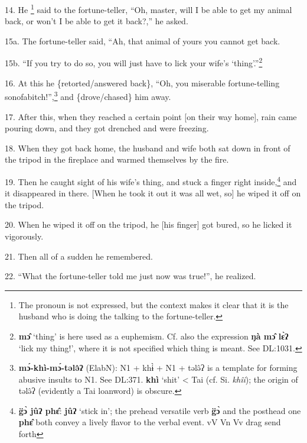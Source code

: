 14. He \footnote{The pronoun is not expressed, but the context makes it clear that it is the husband who is doing the talking to the fortune-teller.} said to the fortune-teller, ``Oh, master, will I be able to get my animal
back, or won't I be able to get it back?,'' he asked.

15a. The fortune-teller said, ``Ah, that animal of yours you cannot get back.

15b. ``If you try to do so, you will just have to lick your wife's `thing'.''\footnote{\textbf{mɔ̂ }`thing' is here used as a euphemism. Cf. also the expression \textbf{ŋà mɔ̂ lɛ̀ʔ} `lick my thing!', where it is not specified which thing is meant. See DL:1031.}

16. At this he \{retorted/answered back\}, ``Oh, you miserable fortune-telling
sonofabitch!'',\footnote{\textbf{mɔ́-khì-mɔ́-tələ̂ʔ} (ElabN): N1 + khɨ̀ + N1 + tələ̂ʔ is a template for forming abusive insults to N1. See DL:371. \textbf{khì} `shit' < Tai (cf. Si. \textit{khîi}); the origin of tələ̂ʔ (evidently a Tai loanword) is obscure.} and \{drove/chased\} him away.

17. After this, when they reached a certain point [on their way home], rain came
pouring down, and they got drenched and were freezing.

18. When they got back home, the husband and wife both sat down in front of the
tripod in the fireplace and warmed themselves by the fire.

19. Then he caught sight of his wife's thing, and stuck a finger right inside,\footnote{\textbf{g̈ɔ̀ jûʔ phɛ̂}: \textbf{jûʔ} `stick in'; the prehead versatile verb \textbf{g̈ɔ̀} and the posthead one \textbf{phɛ̂} both convey a lively flavor to the verbal event.  vV Vn Vv  drag      send forth}
and it disappeared in there. [When he took it out it was all wet, so] he wiped
it off on the tripod.

20. When he wiped it off on the tripod, he [his finger] got bured, so he licked
it vigorously.

21. Then all of a sudden he remembered.

22. ``What the fortune-teller told me just now was true!'', he realized.

